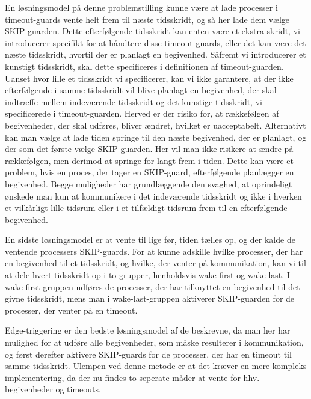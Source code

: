 En løsningsmodel på denne problemstilling kunne være at lade processer i timeout-guards vente helt frem til næste tidsskridt, og så her lade dem vælge SKIP-guarden. Dette efterfølgende tidsskridt kan enten være et ekstra skridt, vi introducerer specifikt for at håndtere disse timeout-guards, eller det kan være det næste tidsskridt, hvortil der er planlagt en begivenhed. 
Såfremt vi introducerer et kunstigt tidsskridt, skal dette specificeres i definitionen af timeout-guarden. Uanset hvor lille et tidsskridt vi specificerer, kan vi ikke garantere, at der ikke efterfølgende i samme tidsskridt vil blive planlagt en begivenhed, der skal indtræffe mellem indeværende tidsskridt og det kunstige tidsskridt, vi specificerede i timeout-guarden. Herved er der risiko for, at rækkefølgen af begivenheder, der skal udføres, bliver ændret, hvilket er uacceptabelt. 
Alternativt kan man vælge at lade tiden springe til den næste begivenhed, der er planlagt, og der som det første vælge SKIP-guarden. Her vil man ikke risikere at ændre på rækkefølgen, men derimod at springe for langt frem i tiden. Dette kan være et problem, hvis en proces, der tager en SKIP-guard, efterfølgende planlægger en begivenhed.
Begge muligheder har grundlæggende den svaghed, at oprindeligt ønskede man kun at kommunikere i det indeværende tidsskridt og ikke i hverken et vilkårligt lille tidsrum eller i et tilfældigt tidsrum frem til en efterfølgende begivenhed.

En sidste løsningsmodel er at vente til lige før, tiden tælles op, og der kalde de ventende processers SKIP-guards. 
For at kunne adskille hvilke processer, der har en begivenhed til et tidsskridt, og hvilke, der venter på kommunikation, kan vi  til at dele hvert tidsskridt op i to grupper, henholdsvis wake-first og wake-last.
I wake-first-gruppen udføres de processer, der har tilknyttet en begivenhed til det givne tidsskridt, mens man i  wake-last-gruppen aktiverer SKIP-guarden for de processer, der venter på en timeout.

Edge-triggering er den bedste løsningsmodel af de beskrevne, da man her har mulighed for at udføre alle begivenheder, som måske resulterer i kommunikation, og først derefter aktivere SKIP-guards for de processer, der har en timeout til samme tidsskridt. Ulempen ved denne metode er at det kræver en mere kompleks implementering, da der nu findes to seperate måder at vente for hhv. begivenheder og timeouts.

